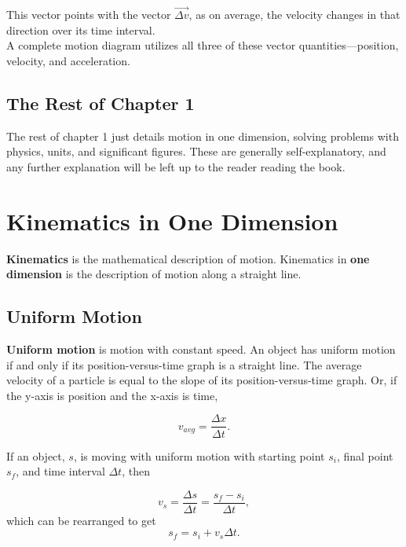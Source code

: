 \documentclass[12pt,letterpaper]{article}
\begin{document}
This vector points with the vector $\vec{\Delta v}$, as on average, the velocity changes in that direction over its time interval. \\

A complete motion diagram utilizes all three of these vector quantities---position, velocity, and acceleration.

\subsection[The Rest of Chapter 1]{The Rest of Chapter 1}

The rest of chapter 1 just details motion in one dimension, solving problems with physics, units, and significant figures. These are generally self-explanatory, and any further explanation will be left up to the reader reading the book.

\pagebreak

\section[Kinematics in One Dimension]{Kinematics in One Dimension}

\textbf{Kinematics} is the mathematical description of motion. Kinematics in \textbf{one dimension} is the description of motion along a straight line.

\subsection[Uniform Motion]{Uniform Motion}

\textbf{Uniform motion} is motion with constant speed. An object has uniform motion if and only if its position-versus-time graph is a straight line. The average velocity of a particle is equal to the slope of its position-versus-time graph. Or, if the y-axis is position and the x-axis is time,

\begin{center}
$$v_{avg}=\frac{\Delta x}{\Delta t}.$$\linebreak
\end{center}

If an object, $s$, is moving with uniform motion with starting point $s_{i}$, final point $s_{f}$, and time interval $\Delta t$, then 

\begin{center}
$$v_{s}=\frac{\Delta s}{\Delta t}=\frac{s_{f}-s_{i}}{\Delta t},$$ which can be rearranged to get $$s_{f}=s_{i}+v_{s}\Delta t.$$\linebreak
\end{center}
\end{document}
